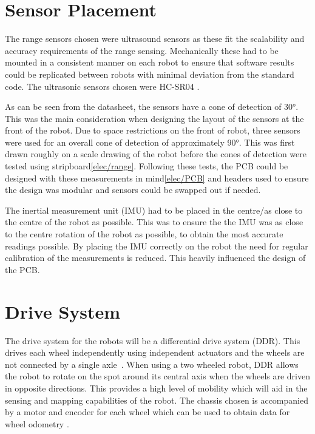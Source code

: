 \section{Sensor Placement}\label{mech/sensors}
The range sensors chosen were ultrasound sensors as these fit the scalability and accuracy requirements of the range sensing. Mechanically these had to be mounted in a consistent manner on each robot to ensure that software results could be replicated between robots with minimal deviation from the standard code. The ultrasonic sensors chosen were HC-SR04 .

As can be seen from the datasheet, the sensors have a cone of detection of \ang{30}. This was the main consideration when designing the layout of the sensors at the front of the robot. Due to space restrictions on the front of robot, three sensors were used for an overall cone of detection of approximately \ang{90}. This was first drawn roughly on a scale drawing of the robot before the cones of detection were tested using stripboard\ref{elec/range}. Following these tests, the PCB could be designed with these measurements in mind\ref{elec/PCB} and headers used to ensure the design was modular and sensors could be swapped out if needed. 

The inertial measurement unit (IMU) had to be placed in the centre/as close to the centre of the robot as possible. This was to ensure the the IMU was as close to the centre rotation of the robot as possible, to obtain the most accurate readings possible. By placing the IMU correctly on the robot the need for regular calibration of the measurements is reduced. This heavily influenced the design of the PCB. 


\section{Drive System}\label{mech/drive}

The drive system for the robots will be a differential drive system (DDR).
This drives each wheel independently using independent actuators and the
wheels are not connected by a single axle~\cite[p.~146]{braunl_embedded_2013}.
When using a two wheeled robot, DDR allows the
robot to rotate on the spot around its central axis when the wheels are
driven in opposite directions. This provides a high level of mobility which
will aid in the sensing and mapping capabilities of the robot. The chassis chosen is accompanied by a motor and encoder for each wheel which can be used to obtain data for wheel odometry .
